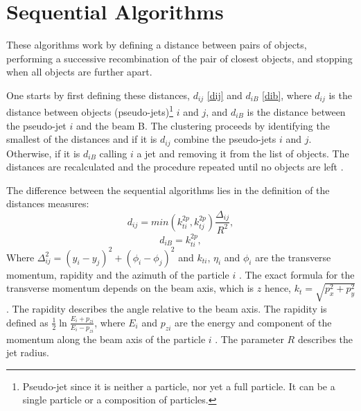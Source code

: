 \section{Sequential Algorithms}

These algorithms work by defining a distance between pairs of objects, performing a successive recombination of the pair of closest objects, and stopping when all objects are further apart.

One starts by first defining these distances, $d_{ij}$ \eqref{dij} and $d_{iB}$ \eqref{dib}, where $d_{ij}$ is the distance between objects (pseudo-jets)\footnote{Pseudo-jet since it is neither a particle, nor yet a full particle. It can be a single particle or a composition of particles.}
$i$ and $j$, and $d_{iB}$ is the distance between the pseudo-jet $i$ and the beam B. The clustering proceeds by identifying the smallest of the distances and if it is $d_{ij}$ combine the pseudo-jets $i$ and $j$. Otherwise, if it is $d_{iB}$ calling $i$ a jet and removing it from the list of objects. The distances are recalculated and the procedure repeated until no objects are left \citep{Cacciari:2008gp}. 

The difference between the sequential algorithms lies in the definition of the distances measures:
\begin{equation}
d_{ij} = min(k_{ti}^{2p}, k_{tj}^{2p}) \frac{\Delta_{ij}}{R^{2}},
\label{dij}\end{equation}         
\begin{equation}
d_{iB} = k_{ti}^{2p} ,
\label{dib}\end{equation}
Where $\Delta_{ij}^{2} = (y_{i} - y_{j})^2 + (\phi_{i} - \phi_{j})^2$ and $k_{ti}$, $\eta_{i}$ and $\phi_{i}$ are the transverse momentum, rapidity and  the azimuth of the particle $i$ \citep{Cacciari:2008gp}. The exact formula for the transverse momentum depends on the beam axis, which is $z$ hence, $k_{t} = \sqrt{p_x^2 + p_y^2}$. The rapidity describes the angle relative to the beam axis.
The rapidity is defined as $\frac{1}{2} \ln \frac{E_i + p_{zi}}{E_i - p_{zi}}$, where  $E_i$ and $p_{zi}$ are the energy and component of the momentum along the beam axis of the particle $i$ \citep{Cacciari:2011ma}. The parameter $R$ describes the jet radius. 

